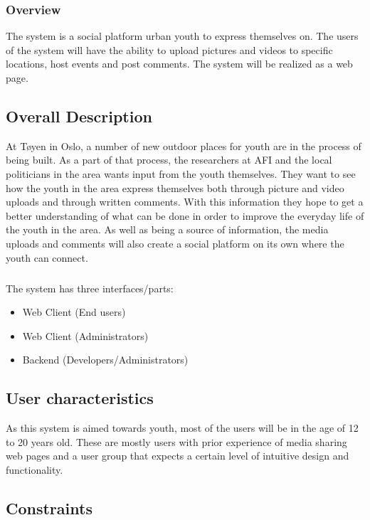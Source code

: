 \subsubsection*{Overview}
The system is a social platform urban youth to express themselves on. The users of the system will have the ability to upload pictures and videos to specific locations, host events and post comments. The system will be realized as a web page.

\subsection{Overall Description}
\label{subsec:SysReqIntroDescr}

At T\o yen in Oslo, a number of new outdoor places for youth are in the process of being built. As a part of that process, the researchers at AFI and the local politicians in the area wants input from the youth themselves. They want to see how the youth in the area express themselves both through picture and video uploads and through written comments. With this information they hope to get a better understanding of what can be done in order to improve the everyday life of the youth in the area. As well as being a source of information, the media uploads and comments will also create a social platform on its own where the youth can connect.
\subparagraph{} The system has three interfaces/parts:
\begin{itemize}
    \item Web Client (End users)
    \item Web Client (Administrators)
    \item Backend (Developers/Administrators)
\end{itemize}

\subsection{User characteristics}
\label{subsec:SysReqIntroUserChar}

As this system is aimed towards youth, most of the users will be in the age of 12 to 20 years old. These are mostly users with prior experience of media sharing web pages and a user group that expects a certain level of intuitive design and functionality.

\subsection{Constraints}
\label{subsec:SysReqIntroConstr}

